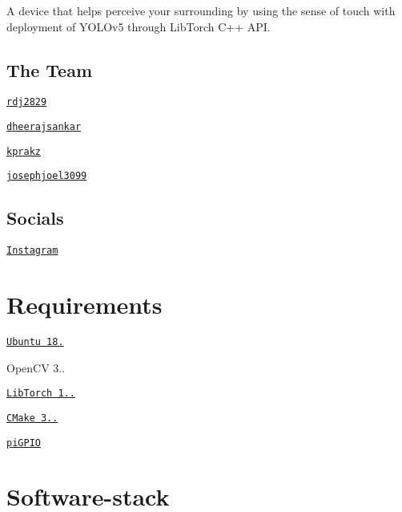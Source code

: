 A device that helps perceive your surrounding by using the sense of touch with deployment of Y\+O\+L\+Ov5 through Lib\+Torch C++ A\+PI.

\subsection*{The Team}


\begin{DoxyItemize}
\item \href{https://github.com/rdj2829}{\tt rdj2829}
\item \href{https://github.com/dheerajsankar}{\tt dheerajsankar}
\item \href{https://github.com/kprakz}{\tt kprakz}
\item \href{https://github.com/josephjoel3099}{\tt josephjoel3099}
\end{DoxyItemize}

\subsection*{Socials}


\begin{DoxyItemize}
\item \href{https://www.instagram.com/hapticvision_/}{\tt Instagram}
\end{DoxyItemize}

\section*{Requirements}


\begin{DoxyItemize}
\item \href{https://www.instructables.com/Install-Ubuntu-18044-LTS-on-Your-Raspberry-Pi-Boar/}{\tt Ubuntu 18.}
\item Open\+CV 3..
\item \href{https://download.pytorch.org/libtorch/nightly/cpu/libtorch-shared-with-deps-latest.zip}{\tt Lib\+Torch 1..}
\item \href{https://askubuntu.com/questions/355565/how-do-i-install-the-latest-version-of-cmake-from-the-command-line}{\tt C\+Make 3..}
\item \href{https://abyz.me.uk/rpi/pigpio/download.html}{\tt pi\+G\+P\+IO}
\end{DoxyItemize}

\section*{Software-\/stack}

